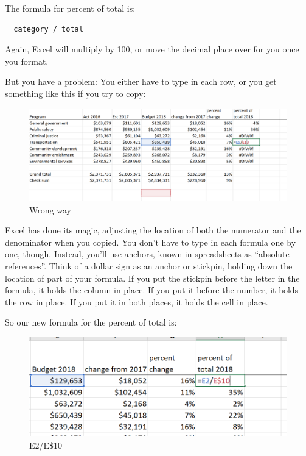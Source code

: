 \documentclass[
  letterpaper,
  DIV=11,
  numbers=noendperiod]{scrreprt}
\begin{document}
The formula for percent of total is:

\begin{verbatim}
  category / total
\end{verbatim}

Again, Excel will multiply by 100, or move the decimal place over for
you once you format.

But you have a problem: You either have to type in each row, or you get
something like this if you try to copy:

\begin{figure}

{\centering \includegraphics[width=1\textwidth,height=\textheight]{./images/xl_mathreview_05.png}

}

\caption{Wrong way}

\end{figure}

Excel has done its magic, adjusting the location of both the numerator
and the denominator when you copied. You don't have to type in each
formula one by one, though. Instead, you'll use anchors, known in
spreadsheets as ``absolute references''. Think of a dollar sign as an
anchor or stickpin, holding down the location of part of your formula.
If you put the stickpin before the letter in the formula, it holds the
column in place. If you put it before the number, it holds the row in
place. If you put it in both places, it holds the cell in place.

So our new formula for the percent of total is:

\begin{figure}

{\centering \includegraphics[width=1\textwidth,height=\textheight]{./images/xl_mathreview_06.png}

}

\caption{E2/E\$10}

\end{figure}
\end{document}
